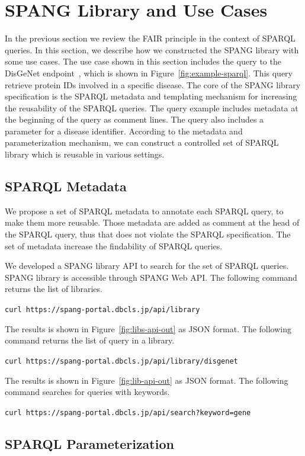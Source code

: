 \documentclass[runningheads]{llncs}
\begin{document}
\section{SPANG Library and Use Cases}
In the previous section we review the FAIR principle in the context of SPARQL queries.
In this section, we describe how we constructed the SPANG library with some use cases.
The use case shown in this section includes the query to the DisGeNet endpoint~\cite{disgenet}, which is shown in Figure~\ref{fig:example-sparql}.
This query retrieve protein IDs involved in a specific disease.
The core of the SPANG library specification is the SPARQL metadata and templating mechanism for increasing the reusability of the SPARQL queries.
The query example includes metadata at the beginning of the query as comment lines.
The query also includes a parameter for a disease identifier.
According to the metadata and parameterization mechanism, we can construct a controlled set of SPARQL library which is reusable in various settings.


\subsection{SPARQL Metadata}

We propose a set of SPARQL metadata to annotate each SPARQL query, to make them more reusable.
Those metadata are added as comment at the head of the SPARQL query, thus that does not violate the SPARQL specification. 
The set of metadata increase the findability of SPARQL queries.

We developed a SPANG library API to search for the set of SPARQL queries.
SPANG library is accessible through SPANG Web API.
The following command returns the list of libraries.

\texttt{curl https://spang-portal.dbcls.jp/api/library}

The results is shown in Figure~\ref{fig:libs-api-out} as JSON format.
The following command returns the list of query in a library.

\texttt{curl https://spang-portal.dbcls.jp/api/library/disgenet}

The results is shown in Figure~\ref{fig:lib-api-out} as JSON format.
The following command searches for queries with keywords.

\texttt{curl https://spang-portal.dbcls.jp/api/search?keyword=gene}


\subsection{SPARQL Parameterization}
\end{document}
